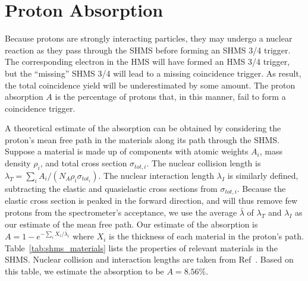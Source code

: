 \section{Proton Absorption}

Because protons are strongly interacting particles, they may undergo a nuclear
reaction as they pass through the SHMS before forming an SHMS 3/4 trigger.
The corresponding electron in the HMS will have formed an HMS 3/4 trigger, but
the ``missing'' SHMS 3/4 will lead to a missing coincidence trigger.
As result, the total coincidence yield will be underestimated by some amount.
The proton absorption $A$ is the percentage of protons that, in this manner,
fail to form a coincidence trigger.


A theoretical estimate of the absorption can be obtained by considering the
proton's mean free path in the materials along its path through the SHMS.
Suppose a material is made up of components with atomic weights $A_i$, mass
density $\rho_i$, and total cross section $\sigma_{tot,i}$.
The nuclear collision length is
$\lambda_{T} = \sum_i A_i / (N_A \rho_i \sigma_{tot_i})$.
The nuclear interaction length $\lambda_{I}$ is similarly defined, subtracting
the elastic and quasielastic cross sections from $\sigma_{tot,i}$.
Because the elastic cross section is peaked in the forward direction, and will
thus remove few protons from the spectrometer's acceptance, we use the average
$\bar\lambda$ of $\lambda_T$ and $\lambda_I$ as our estimate of the mean free
path.
Our estimate of the absorption is $A=1-e^{-\sum_i X_i/\bar\lambda_i}$ where
$X_i$ is the thickness of each material in the proton's path.
Table~\ref{tab:shms_materials} lists the properties of relevant materials in
the SHMS.
Nuclear collision and interaction lengths are taken from
Ref~\cite{pdg_material_properties}.
Based on this table, we estimate the absorption to be $A=8.56\%$.


